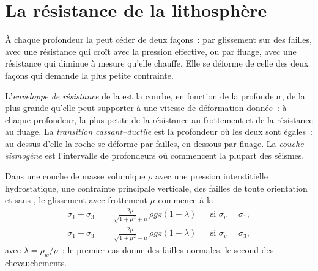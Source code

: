 \section{La résistance de la lithosphère}\label{sec:b1:stress-strain-rheology:envelope}

À chaque profondeur la  peut céder de deux façons~: par glissement sur des failles,
avec une résistance qui croît avec la pression effective, ou par fluage, avec une
résistance qui diminue à mesure qu'elle chauffe. Elle se déforme de celle des deux façons qui demande la
plus petite contrainte.

\begin{definition}\label{def:b1:stress-strain-rheology:strength-envelope}
L'\emph{enveloppe de résistance} de la  est
la courbe, en fonction de la profondeur, de la plus grande  qu'elle peut supporter à une
vitesse de déformation donnée~: à chaque profondeur, la plus petite de la résistance au frottement et
de la résistance au fluage. La \emph{transition cassant--ductile} est la profondeur où les deux sont égales~: au-dessus d'elle la roche
se déforme par failles, en dessous par fluage. La \emph{couche
sismogène} est l'intervalle de profondeurs où commencent la plupart des
séismes.
\end{definition}

\begin{proposition}\label{prop:b1:stress-strain-rheology:brittle-gradient}
Dans une couche de masse volumique $\rho$ avec une pression interstitielle hydrostatique, une contrainte
principale verticale, des failles de toute orientation et sans , le glissement avec
frottement $\mu$ commence à la 
\begin{align*}
  \sigma_1 - \sigma_3 &= \frac{2\mu}{\sqrt{1+\mu^2} + \mu}\,\rho g z(1-\lambda)
  && \text{si $\sigma_v = \sigma_1$}, \\
  \sigma_1 - \sigma_3 &= \frac{2\mu}{\sqrt{1+\mu^2} - \mu}\,\rho g z(1-\lambda)
  && \text{si $\sigma_v = \sigma_3$},
\end{align*}
avec $\lambda = \rho_w/\rho$~: le premier cas donne des failles normales, le second
des chevauchements.
\end{proposition}


